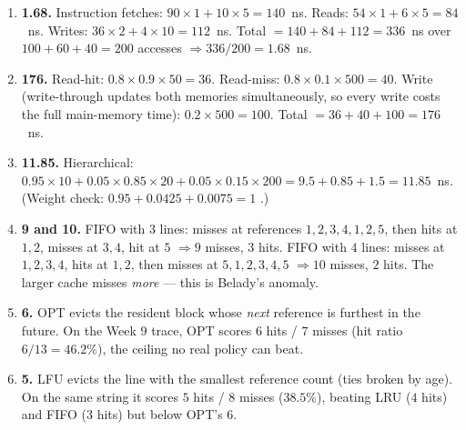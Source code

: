 \documentclass[11pt]{article}
\begin{document}
\begin{enumerate}
\item[\textbf{Q8}] \textbf{1.68.} Instruction fetches: $90\times1 + 10\times5 = 140$~ns. Reads: $54\times1 + 6\times5 = 84$~ns. Writes: $36\times2 + 4\times10 = 112$~ns. Total $=140+84+112=336$~ns over $100+60+40=200$ accesses $\Rightarrow 336/200=1.68$~ns.

\item[\textbf{Q9}] \textbf{176.} Read-hit: $0.8\times0.9\times50=36$. Read-miss: $0.8\times0.1\times500=40$. Write (write-through updates both memories simultaneously, so every write costs the full main-memory time): $0.2\times500=100$. Total $=36+40+100=176$~ns.

\item[\textbf{Q10}] \textbf{11.85.} Hierarchical: $0.95\times10 + 0.05\times0.85\times20 + 0.05\times0.15\times200 = 9.5 + 0.85 + 1.5 = 11.85$~ns. (Weight check: $0.95+0.0425+0.0075=1$ \checkmark.)

\item[\textbf{Q11}] \textbf{9 and 10.} FIFO with $3$ lines: misses at references $1,2,3,4,1,2,5$, then hits at $1,2$, misses at $3,4$, hit at $5$ $\Rightarrow 9$ misses, $3$ hits. FIFO with $4$ lines: misses at $1,2,3,4$, hits at $1,2$, then misses at $5,1,2,3,4,5$ $\Rightarrow 10$ misses, $2$ hits. The larger cache misses \emph{more} — this is Belady's anomaly.

\item[\textbf{Q12}] \textbf{6.} OPT evicts the resident block whose \emph{next} reference is furthest in the future. On the Week 9 trace, OPT scores $6$ hits / $7$ misses (hit ratio $6/13=46.2\%$), the ceiling no real policy can beat.

\item[\textbf{Q13}] \textbf{5.} LFU evicts the line with the smallest reference count (ties broken by age). On the same string it scores $5$ hits / $8$ misses ($38.5\%$), beating LRU ($4$ hits) and FIFO ($3$ hits) but below OPT's $6$.
\end{enumerate}
\end{document}
